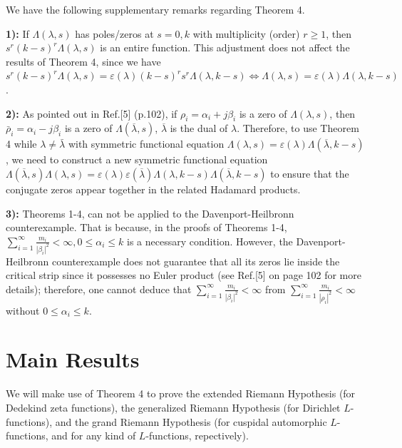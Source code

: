 \documentclass[12pt]{article}
\begin{document}
\noindent We have the following supplementary remarks regarding Theorem 4.

\textbf{1):} If $\Lambda(\lambda, s)$ has poles/zeros at $s=0, k$ with multiplicity (order) $r\geq 1$, then $s^r(k-s)^r\Lambda(\lambda, s)$ is an entire function. This adjustment does not affect the results of Theorem 4, since we have $s^r(k-s)^r\Lambda(\lambda, s)=\varepsilon(\lambda)(k-s)^r s^r\Lambda(\lambda, k-s)\Leftrightarrow \Lambda(\lambda, s)=\varepsilon(\lambda)\Lambda(\lambda, k-s)$.

\textbf{2):} As pointed out in Ref.[5] (p.102), if $\rho_i= \alpha_i +j\beta_i$ is a zero of $\Lambda(\lambda, s)$, then $\bar{\rho}_i= \alpha_i -j\beta_i$ is a zero of $\Lambda(\overline{\lambda}, s)$, $\overline{\lambda}$ is the dual of $\lambda$. Therefore, to use Theorem 4 while $\lambda\neq\bar{\lambda}$ with symmetric functional equation $\Lambda(\lambda, s)=\varepsilon(\lambda)\Lambda(\overline\lambda, k-s)$, we need to construct a new symmetric functional equation $\Lambda(\overline{\lambda}, s) \Lambda(\lambda, s)= \varepsilon(\lambda)\varepsilon(\overline\lambda) \Lambda(\lambda, k-s)\Lambda(\overline{\lambda}, k-s)$ to ensure that the conjugate zeros appear together in the related Hadamard products.

\textbf{3):} Theorems 1-4, can not be applied to the Davenport-Heilbronn counterexample. That is because, in the proofs of Theorems 1-4, $\sum_{i=1}^{\infty}\frac{m_i}{|\beta_i|^2}<\infty, 0\leq \alpha_i \leq k$ is a necessary condition.
However, the Davenport-Heilbronn counterexample does not guarantee that all its zeros lie inside the critical strip since it possesses no Euler product (see Ref.[5] on page 102 for more details); therefore, one cannot deduce that $\sum_{i=1}^{\infty}\frac{m_i}{|\beta_i|^2}<\infty$ from $\sum_{i=1}^{\infty}\frac{m_i}{|\rho_i|^2}<\infty$ without $0\leq \alpha_i \leq k$.


\section{Main Results}

We will make use of Theorem 4 to prove the extended Riemann Hypothesis (for Dedekind zeta functions), the generalized Riemann Hypothesis (for Dirichlet \( L \)-functions), and the grand Riemann Hypothesis (for cuspidal automorphic \( L \)-functions, and for any kind of \( L \)-functions, repectively).
\end{document}
